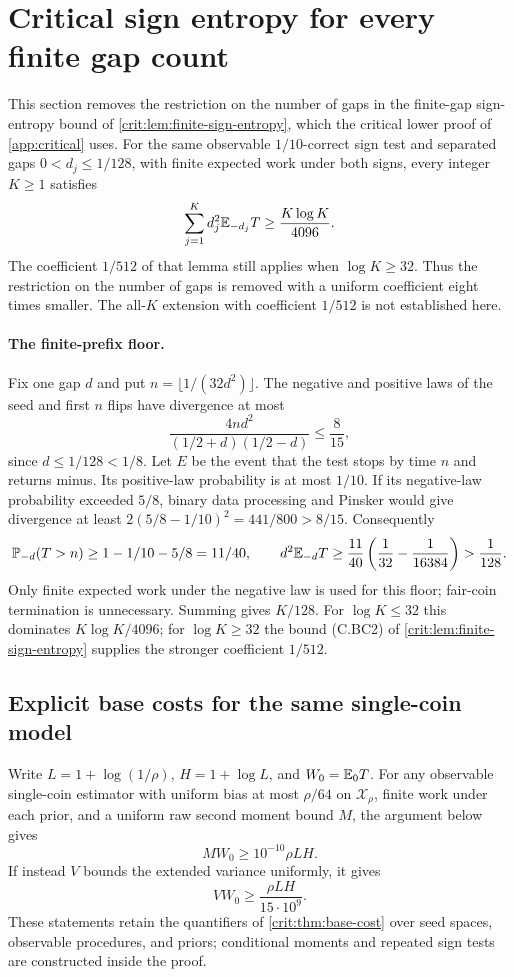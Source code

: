 \section{Critical sign entropy for every finite gap count}\label{sec:all-sizes}

This section removes the restriction on the number of gaps in the
finite-gap sign-entropy bound of \cref{crit:lem:finite-sign-entropy}, which
the critical lower proof of \cref{app:critical} uses. For the same
observable $1/10$-correct sign test and separated gaps $0<d_j\le1/128$,
with finite expected work under both signs, every integer $K\ge1$ satisfies
\[
 \sum_{j=1}^K d_j^2\mathbb E_{-d_j}T\ge\frac{K\log K}{4096}.
\]
The coefficient $1/512$ of that lemma still applies when $\log K\ge32$.
Thus the restriction on the number of gaps is removed with a uniform
coefficient eight times smaller. The all-$K$ extension with coefficient
$1/512$ is not established here.

\paragraph{The finite-prefix floor.}
Fix one gap $d$ and put $n=\lfloor1/(32d^2)\rfloor$. The negative and
positive laws of the seed and first $n$ flips have divergence at most
\[
 \frac{4nd^2}{(1/2+d)(1/2-d)}\le\frac8{15},
\]
since $d\le1/128<1/8$. Let $E$ be the event that the test stops by time
$n$ and returns minus. Its positive-law probability is at most $1/10$.
If its negative-law probability exceeded $5/8$, binary data processing
and Pinsker would give divergence at least
$2(5/8-1/10)^2=441/800>8/15$. Consequently
\[
 \mathbb P_{-d}(T>n)\ge1-1/10-5/8=11/40,
 \qquad
 d^2\mathbb E_{-d}T\ge\frac{11}{40}\left(\frac1{32}-\frac1{16384}\right)
 >\frac1{128}.
\]
Only finite expected work under the negative law is used for this floor;
fair-coin termination is unnecessary. Summing gives $K/128$. For
$\log K\le32$ this dominates $K\log K/4096$; for $\log K\ge32$ the
bound (C.BC2) of \cref{crit:lem:finite-sign-entropy}
supplies the stronger coefficient $1/512$.

\subsection{Explicit base costs for the same single-coin model}
Write $L=1+\log(1/\rho)$, $H=1+\log L$, and $W_0=\mathbb E_0T$.
For any observable single-coin estimator with uniform bias at most
$\rho/64$ on $\mathcal X_\rho$, finite work under each prior, and a
uniform raw second moment bound $M$, the argument below gives
\[
 M W_0\ge 10^{-10}\rho LH.
\]
If instead $V$ bounds the extended variance uniformly, it gives
\[
 V W_0\ge\frac{\rho LH}{15\cdot10^9}.
\]
These statements retain the quantifiers of \cref{crit:thm:base-cost} over seed spaces,
observable procedures, and priors; conditional moments and repeated
sign tests are constructed inside the proof.

